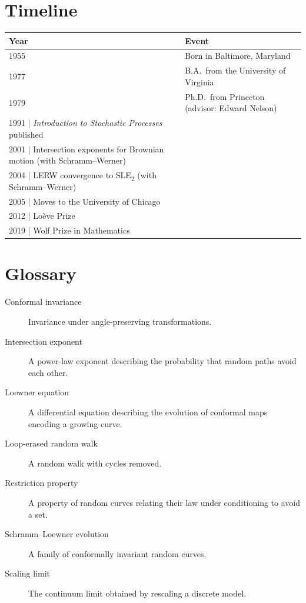\section*{Timeline}

\begin{tabularx}{\linewidth}{|p{1.5cm}|>{\raggedright\arraybackslash}X|}
\hline
\textbf{Year} & \textbf{Event} \\ \hline
1955 & Born in Baltimore, Maryland \\ \hline
1977 & B.A.\ from the University of Virginia \\ \hline
1979 & Ph.D.\ from Princeton (advisor: Edward Nelson) \\ \hline
1991 | \textit{Introduction to Stochastic Processes} published \\ \hline
2001 | Intersection exponents for Brownian motion (with Schramm--Werner) \\ \hline
2004 | LERW convergence to SLE$_2$ (with Schramm--Werner) \\ \hline
2005 | Moves to the University of Chicago \\ \hline
2012 | Lo\`eve Prize \\ \hline
2019 | Wolf Prize in Mathematics \\ \hline
\end{tabularx}

\section*{Glossary}

\begin{description}
    \item[Conformal invariance] Invariance under angle-preserving transformations.
    \item[Intersection exponent] A power-law exponent describing the probability that random paths avoid each other.
    \item[Loewner equation] A differential equation describing the evolution of conformal maps encoding a growing curve.
    \item[Loop-erased random walk] A random walk with cycles removed.
    \item[Restriction property] A property of random curves relating their law under conditioning to avoid a set.
    \item[Schramm--Loewner evolution] A family of conformally invariant random curves.
    \item[Scaling limit] The continuum limit obtained by rescaling a discrete model.
\end{description}


